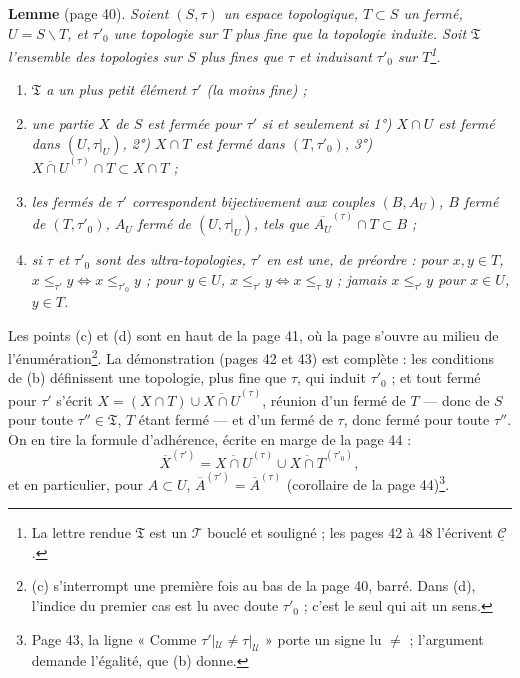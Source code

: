 \documentclass[11pt,a4paper]{article}
\begin{document}
\textbf{Lemme} (page 40). \emph{Soient $(S, \tau)$ un espace topologique, $T
\subset S$ un fermé, $U = S \smallsetminus T$, et $\tau'_{0}$ une topologie sur
$T$ plus fine que la topologie induite. Soit $\mathfrak{T}$ l'ensemble des
topologies sur $S$ plus fines que $\tau$ et induisant $\tau'_{0}$ sur
$T$\footnote{La lettre rendue $\mathfrak{T}$ est un $\mathcal{T}$ bouclé et
souligné ; les pages 42 à 48 l'écrivent $\underline{\mathcal{C}}$.}.}
\begin{enumerate}
\item[(a)] \emph{$\mathfrak{T}$ a un plus petit élément $\tau'$ (la moins fine) ;}
\item[(b)] \emph{une partie $X$ de $S$ est fermée pour $\tau'$ si et seulement si
1°) $X \cap U$ est fermé dans $(U, \tau|_{U})$, 2°) $X \cap T$ est fermé dans
$(T, \tau'_{0})$, 3°) $\overline{X \cap U}^{(\tau)} \cap T \subset X \cap T$ ;}
\item[(c)] \emph{les fermés de $\tau'$ correspondent bijectivement aux couples
$(B, A_{U})$, $B$ fermé de $(T, \tau'_{0})$, $A_{U}$ fermé de $(U, \tau|_{U})$,
tels que $\overline{A_{U}}^{(\tau)} \cap T \subset B$ ;}
\item[(d)] \emph{si $\tau$ et $\tau'_{0}$ sont des ultra-topologies, $\tau'$ en
est une, de préordre : pour $x, y \in T$, $x \leq_{\tau'} y \iff x
\leq_{\tau'_{0}} y$ ; pour $y \in U$, $x \leq_{\tau'} y \iff x \leq_{\tau} y$ ;
jamais $x \leq_{\tau'} y$ pour $x \in U$, $y \in T$.}
\end{enumerate}

\noindent Les points (c) et (d) sont en haut de la page 41, où la page
s'ouvre au milieu de l'énumération\footnote{(c) s'interrompt une première fois
au bas de la page 40, barré. Dans (d), l'indice du premier cas est lu avec
doute $\tau'_{0}$ ; c'est le seul qui ait un sens.}. La démonstration
(pages 42 et 43) est complète : les conditions de (b) définissent une topologie,
plus fine que $\tau$, qui induit $\tau'_{0}$ ; et tout fermé pour $\tau'$
s'écrit $X = (X \cap T) \cup \overline{X \cap U}^{(\tau)}$, réunion d'un fermé
de $T$ --- donc de $S$ pour toute $\tau'' \in \mathfrak{T}$, $T$ étant fermé ---
et d'un fermé de $\tau$, donc fermé pour toute $\tau''$. On en tire la formule
d'adhérence, écrite en marge de la page 44 :
\[
\overline{X}^{(\tau')} = \overline{X \cap U}^{(\tau)} \cup \overline{X \cap
T}^{(\tau'_{0})} ,
\]
et en particulier, pour $A \subset U$, $\overline{A}^{(\tau')} =
\overline{A}^{(\tau)}$ (corollaire de la page 44)\footnote{Page 43, la ligne
« Comme $\tau'|_{\mathcal{U}} \neq \tau|_{\mathcal{U}}$ » porte un signe lu
$\neq$ ; l'argument demande l'égalité, que (b) donne.}.
\end{document}
